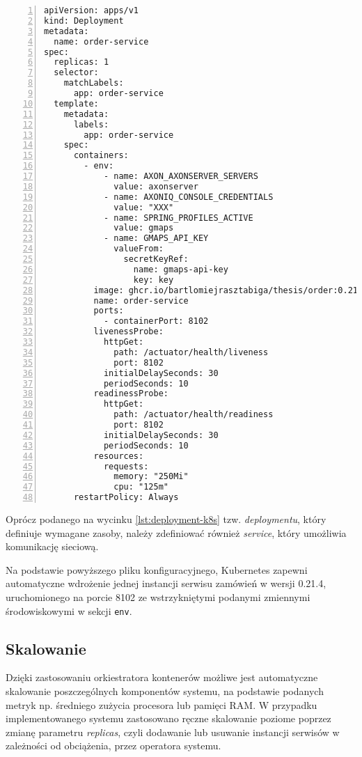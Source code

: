 \begin{lstlisting}[caption={Fragment pliku konfiguracyjnego Kubernetes dla serwisu zamówień},label={lst:deployment-k8s},captionpos=b,numbers=left]
apiVersion: apps/v1
kind: Deployment
metadata:
  name: order-service
spec:
  replicas: 1
  selector:
    matchLabels:
      app: order-service
  template:
    metadata:
      labels:
        app: order-service
    spec:
      containers:
        - env:
            - name: AXON_AXONSERVER_SERVERS
              value: axonserver
            - name: AXONIQ_CONSOLE_CREDENTIALS
              value: "XXX"
            - name: SPRING_PROFILES_ACTIVE
              value: gmaps
            - name: GMAPS_API_KEY
              valueFrom:
                secretKeyRef:
                  name: gmaps-api-key
                  key: key
          image: ghcr.io/bartlomiejrasztabiga/thesis/order:0.21.4
          name: order-service
          ports:
            - containerPort: 8102
          livenessProbe:
            httpGet:
              path: /actuator/health/liveness
              port: 8102
            initialDelaySeconds: 30
            periodSeconds: 10
          readinessProbe:
            httpGet:
              path: /actuator/health/readiness
              port: 8102
            initialDelaySeconds: 30
            periodSeconds: 10
          resources:
            requests:
              memory: "250Mi"
              cpu: "125m"
      restartPolicy: Always
\end{lstlisting}

Oprócz podanego na wycinku \ref{lst:deployment-k8s} tzw. \textit{deploymentu}, który definiuje wymagane zasoby, należy zdefiniować również \textit{service}, który umożliwia komunikację sieciową.

Na podstawie powyższego pliku konfiguracyjnego, Kubernetes zapewni automatyczne wdrożenie jednej instancji serwisu zamówień w wersji 0.21.4, uruchomionego na porcie 8102 ze wstrzykniętymi podanymi zmiennymi środowiskowymi w sekcji \texttt{env}.

\subsection{Skalowanie}

Dzięki zastosowaniu orkiestratora kontenerów możliwe jest automatyczne skalowanie poszczególnych komponentów systemu, na podstawie podanych metryk np. średniego zużycia procesora lub pamięci RAM. W przypadku implementowanego systemu zastosowano ręczne skalowanie poziome poprzez zmianę parametru \textit{replicas}, czyli dodawanie lub usuwanie instancji serwisów w zależności od obciążenia, przez operatora systemu.

